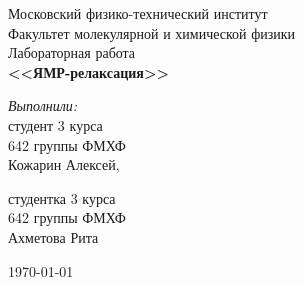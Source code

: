 \begin{titlepage}
\begin{center} 
 
\large Московский физико-технический институт\\
Факультет молекулярной и химической физики\\
\vspace{7cm}
\huge Лабораторная работа\\
\textbf{\Large <<ЯМР-релаксация>>}\\
\end{center} 

\vspace{7.5cm}
{\par \raggedleft \large \emph{Выполнили:}\\ 
	студент 3 курса\\ 
	642 группы ФМХФ\\ 
	Кожарин Алексей, \par
	студентка 3 курса\\ 
	642 группы ФМХФ\\ 
	Ахметова Рита \par
}
\begin{center}
\vfill \today
\date \today
\end{center}
\end{titlepage}
\newpage
